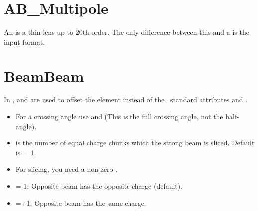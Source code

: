 \section{AB\_Multipole}
\label{s:ab_m}

An  is a thin lens up to 20th order. The only
difference between this and a  is the input format. 

\begin{table}[h]
\end{table}

\section{BeamBeam}
\label{s:bbi}


In \bmad,  and  are used to offset the
 element instead of the \mad\ standard attributes
 and .
\begin{itemize}
\item For a crossing angle use  and  (This is the full crossing angle,
not the half-angle).
\item {} is the number of equal charge chunks which the strong beam is sliced.
      Default is  = 1.
\item For slicing, you need a non-zero .
\item {}=-1: Opposite beam has the opposite charge (default).
\item {}=+1: Opposite beam has the same charge.   
\end{itemize}

